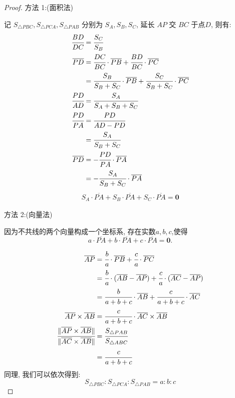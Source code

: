 \begin{proof}

方法 1:(面积法)

记 $S_{\triangle{PBC}},S_{\triangle{PCA}},S_{\triangle{PAB}}$ 分别为 $S_A,S_B,S_C$, 延长 $AP$ 交 $BC$ 于点$D$,
则有:
\begin{align*}
  \cfrac{BD}{DC} &= \cfrac{S_C}{S_B} \\
  \overline{PD}  &= \cfrac{DC}{BC} \cdot \overline{PB} + \cfrac{BD}{BC} \cdot \overline{PC} \\
                 &= \cfrac{S_B}{S_B+S_C} \cdot \overline{PB} + \cfrac{S_C}{S_B+S_C} \cdot \overline{PC} \\
  \cfrac{PD}{AD} &= \cfrac{S_A}{S_A+S_B+S_C} \\
  \cfrac{PD}{PA} &= \cfrac{PD}{AD-PD} \\
                 &= \cfrac{S_A}{S_B+S_C} \\
  \overline{PD}  &= -\cfrac{PD}{PA} \cdot \overline{PA} \\
                 &= -\cfrac{S_A}{S_B+S_C} \cdot \overline{PA} 
\end{align*}
\begin{align*}
  S_A \cdot \overline{PA} + S_B \cdot \overline{PA} + S_C \cdot \overline{PA} = \boldsymbol{0}
\end{align*}

方法 2:(向量法)

因为不共线的两个向量构成一个坐标系, 存在实数$a,b,c$,使得
\[
  a \cdot \overline{PA} + b \cdot \overline{PA} + c \cdot \overline{PA} = \boldsymbol{0}.
\]

\begin{align*}
  \overline{AP} &= \cfrac{b}{a} \cdot \overline{PB} + \cfrac{c}{a} \cdot \overline{PC} \\
                &= \cfrac{b}{a} \cdot (\overline{AB}-\overline{AP}) +
                   \cfrac{c}{a} \cdot (\overline{AC}-\overline{AP}) \\
                &= \cfrac{b}{a+b+c} \cdot \overline{AB} + \cfrac{c}{a+b+c} \cdot \overline{AC} \\
  \overline{AP} \times \overline{AB} &= \cfrac{c}{a+b+c} \cdot \overline{AC} \times \overline{AB} \\
  \cfrac{\|\overline{AP} \times \overline{AB}\|}{\|\overline{AC} \times \overline{AB}\|}
    &= \cfrac{S_{\triangle{PAB}}}{S_{\triangle{ABC}}} \\
    &= \cfrac{c}{a+b+c}
\end{align*}
同理, 我们可以依次得到:
\[
  S_{\triangle{PBC}}:S_{\triangle{PCA}}:S_{\triangle{PAB}} = a:b:c
\]
\end{proof}

